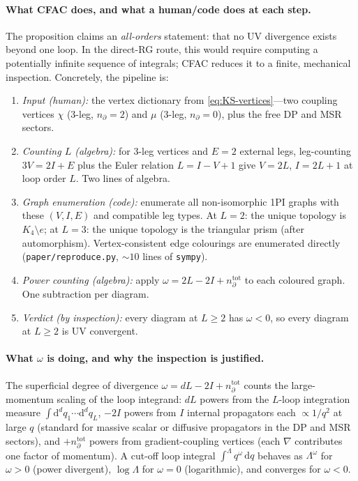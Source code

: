 \documentclass[11pt,a4paper]{article}
\newcommand{\dd}{\mathrm{d}}
\theoremstyle{plain}
\begin{document}
\paragraph{What CFAC does, and what a human/code does at each step.}
The proposition claims an \emph{all-orders} statement: that no UV
divergence exists beyond one loop.  In the direct-RG route, this
would require computing a potentially infinite sequence of
integrals; CFAC reduces it to a finite, mechanical inspection.
Concretely, the pipeline is:
\begin{enumerate}[leftmargin=1.8em, itemsep=-0.2em]
\item \textit{Input (human):} the vertex dictionary from
  \eqref{eq:KS-vertices}---two coupling vertices $\chi$ (3-leg,
  $n_\partial = 2$) and $\mu$ (3-leg, $n_\partial = 0$), plus the
  free DP and MSR sectors.
\item \textit{Counting $L$ (algebra):} for 3-leg vertices and
  $E = 2$ external legs, leg-counting $3V = 2I + E$ plus the
  Euler relation $L = I - V + 1$ give $V = 2L$, $I = 2L + 1$ at
  loop order $L$.  Two lines of algebra.
\item \textit{Graph enumeration (code):} enumerate all
  non-isomorphic 1PI graphs with these $(V, I, E)$ and compatible
  leg types.  At $L = 2$: the unique topology is $K_4 \setminus e$;
  at $L = 3$: the unique topology is the triangular prism (after
  automorphism).  Vertex-consistent edge colourings are enumerated
  directly (\texttt{paper/reproduce.py}, $\sim 10$ lines of
  \texttt{sympy}).
\item \textit{Power counting (algebra):} apply
  $\omega = 2L - 2I + n_\partial^{\mathrm{tot}}$ to each coloured
  graph.  One subtraction per diagram.
\item \textit{Verdict (by inspection):} every diagram at
  $L \geq 2$ has $\omega < 0$, so every diagram at $L \geq 2$ is
  UV convergent.
\end{enumerate}

\paragraph{What $\omega$ is doing, and why the inspection is justified.}
The superficial degree of divergence
$\omega = dL - 2I + n_\partial^{\mathrm{tot}}$ counts the
large-momentum scaling of the loop integrand: $dL$ powers from the
$L$-loop integration measure $\int \dd^d q_1 \cdots \dd^d q_L$,
$-2I$ powers from $I$ internal propagators each
$\propto 1/q^2$ at large $q$ (standard for massive scalar or
diffusive propagators in the DP and MSR sectors), and
$+n_\partial^{\mathrm{tot}}$ powers from gradient-coupling
vertices (each $\nabla$ contributes one factor of momentum).  A
cut-off loop integral $\int^\Lambda q^\omega\,\dd q$ behaves as
$\Lambda^\omega$ for $\omega > 0$ (power divergent),
$\log\Lambda$ for $\omega = 0$ (logarithmic), and converges for
$\omega < 0$.
\end{document}
